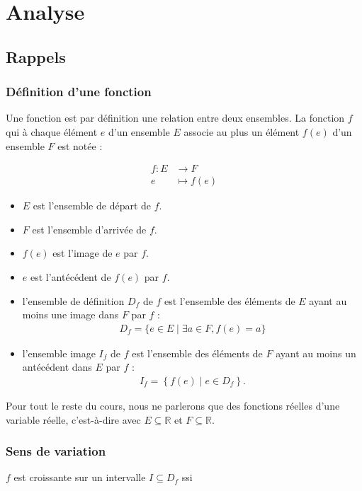 \chapter{Analyse}

\section{Rappels}

\subsection{Définition d'une fonction}
Une fonction est par définition une relation entre deux ensembles. La fonction $f$ qui à chaque élément $e$ d'un ensemble $E$ associe au plus un élément $f(e)$ d'un ensemble $F$ est notée :

\begin{align}
f: E & \rightarrow F \\
e & \mapsto f(e)
\end{align}

\begin{itemize}
    \item $E$ est l'ensemble de départ de $f$.
    \item $F$ est l'ensemble d'arrivée de $f$.
    \item $f(e)$ est l'image de $e$ par $f$.
    \item $e$ est l'antécédent de $f(e)$ par $f$.
    \item l'ensemble de définition $D_f$ de $f$ est l'ensemble des éléments de $E$ ayant au moins une image dans $F$ par $f$ :
    \begin{align}
    D_f=\{e \in E \mid \exists a \in F, f(e)=a\}
    \end{align}
    \item l'ensemble image $I_f$ de $f$ est l'ensemble des éléments de $F$ ayant au moins un antécédent dans $E$ par $f$ :
    \begin{align}
        I_f=\left\{f(e) \mid e \in D_f\right\} .
    \end{align}
\end{itemize}

Pour tout le reste du cours, nous ne parlerons que des fonctions réelles d'une variable réelle, c'est-à-dire avec $E \subseteq \mathbb{R}$ et $F \subseteq \mathbb{R}$.\\

\subsection{Sens de variation}
$f$ est croissante sur un intervalle $I \subseteq D_f$ ssi

